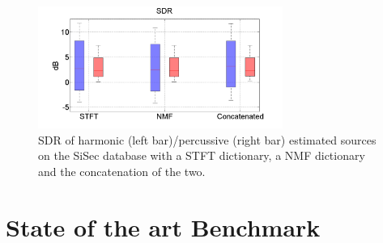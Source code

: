 \documentclass[journal]{IEEEtran}
\begin{document}
\begin{figure}[htb]

  \centering 
  \includegraphics[width=8cm]{fig/DictSDR.png}
  \caption{\label{resultsDict} SDR of harmonic (left bar)/percussive (right bar) estimated sources on the SiSec database with a STFT dictionary, a NMF dictionary and the concatenation of the two.}
  
\end{figure}


%   
%
%
%



\section{State of the art Benchmark}\label{sec:stateoftheart}
\end{document}
